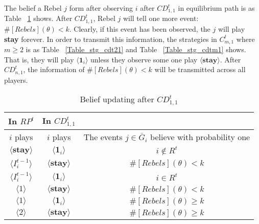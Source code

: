 \documentclass[12pt,letter]{article}
\theoremstyle{definition}
\theoremstyle{remark}
\theoremstyle{claim}
\begin{document}
The belief a Rebel $j$ form after observing $i$ after $CD^t_{1,1}$ in equilibrium path is as Table ~\ref{Table_blf_up_cdt11} shows. After $CD^t_{1,1}$, Rebel $j$ will tell one more event: $\#[Rebels](\theta)< k$. Clearly, if this event has been observed, the $j$ will play \textbf{stay} forever. In order to transmit this information, the strategies in $C^t_{m,1}$ where $m\geq 2$ is as Table ~\ref{Table_stg_cdt21} and Table ~\ref{Table_stg_cdtm1} shows. That is, they will play $\langle \mathbf{1}_i \rangle$ unless they observe some one play $\langle \textbf{stay} \rangle$. After $CD^t_{n,1}$, the information of $\#[Rebels](\theta)< k$ will be transmitted across all players. 
\begin{table}[t]
\caption{Belief updating after $CD^t_{1,1}$}
\label{Table_blf_up_cdt11}
\begin{center}
\begin{tabular}{c c c}
In $RP^t$ 	&  	In $CD^t_{1,1}$		&  \\
\hline
\hline
$i$ plays 		&  	$i$ plays		& The events $j\in \bar{G}_i$ believe with probability one  \\
\hline
$\langle  \textbf{stay} \rangle$ 	& 	$\langle \mathbf{1}_i \rangle$	    & $i\notin R^t$ \\
$\langle  {I^{t-1}_i} \rangle$ 		&  $\langle \textbf{stay} \rangle$		& $\#[Rebels](\theta)< k$     \\
$\langle  {I^{t-1}_i} \rangle$ 		&  $\langle \mathbf{1}_i \rangle$		& $i\in R^t$     \\
$\langle 1 \rangle$ 		             &  $\langle \textbf{stay} \rangle$		& $\#[Rebels](\theta)< k$  \\
$\langle 1 \rangle$ 		             &  $\langle \mathbf{1}_i \rangle$		&  $\#[Rebels](\theta)\geq k$ \\
$\langle 2 \rangle$ 		             &  $\langle \textbf{stay} \rangle$		&  $\#[Rebels](\theta)\geq k$ 
\end{tabular}
\end{center}
\end{table}
\end{document}
